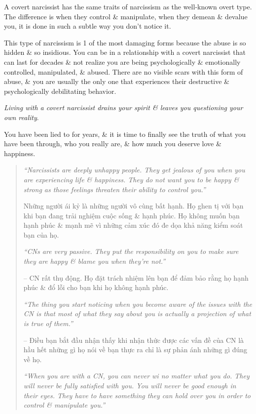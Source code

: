 \documentclass{article}
\begin{document}
\begin{enumerate}
	A covert narcissist has the same traits of narcissism as the well-known overt type. The difference is when they control \& manipulate, when they demean \& devalue you, it is done in such a subtle way you don't notice it.

	This type of narcissism is 1 of the most damaging forms because the abuse is so hidden \& so insidious. You can be in a relationship with a covert narcissist that can last for decades \& not realize you are being psychologically \& emotionally controlled, manipulated, \& abused. There are no visible scars with this form of abuse, \& you are usually the only one that experiences their destructive \& psychologically debilitating behavior.

	{\it Living with a covert narcissist drains your spirit \& leaves you questioning your own reality}.

	You have been lied to for years, \& it is time to finally see the truth of what you have been through, who you really are, \& how much you deserve love \& happiness.
	\begin{quotation}
		{\it``Narcissists are deeply unhappy people. They get jealous of you when you are experiencing life \& happiness. They do not want you to be happy \& strong as those feelings threaten their ability to control you.''}

		Những người ái kỷ là những người vô cùng bất hạnh. Họ ghen tị với bạn khi bạn đang trải nghiệm cuộc sống \& hạnh phúc. Họ không muốn bạn hạnh phúc \& mạnh mẽ vì những cảm xúc đó đe dọa khả năng kiểm soát bạn của họ.

		{\it``CNs are very passive. They put the responsibility on you to make sure they are happy \& blame you when they're not.''}

		-- CN rất thụ động. Họ đặt trách nhiệm lên bạn để đảm bảo rằng họ hạnh phúc \& đổ lỗi cho bạn khi họ không hạnh phúc.

		{\it``The thing you start noticing when you become aware of the issues with the CN is that most of what they say about you is actually a projection of what is true of them.''}

		-- Điều bạn bắt đầu nhận thấy khi nhận thức được các vấn đề của CN là hầu hết những gì họ nói về bạn thực ra chỉ là sự phản ánh những gì đúng về họ.

		{\it``When you are with a CN, you can never wi no matter what you do. They will never be fully satisfied with you. You will never be good enough in their eyes. They have to have something they can hold over you in order to control \& manipulate you.''}


\end{quotation}
\end{enumerate}
\end{document}
